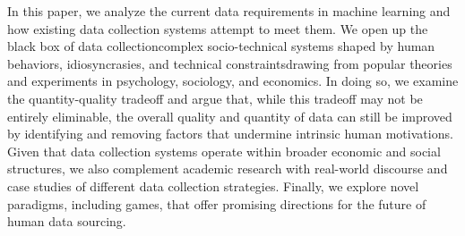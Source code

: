 
In this paper, we analyze the current data requirements in machine learning and how existing data collection systems attempt to meet them. We open up the black box of data collection\textemdash{}complex socio-technical systems shaped by human behaviors, idiosyncrasies, and technical constraints\textemdash{}drawing from popular theories and experiments in psychology, sociology, and economics. In doing so, we examine the quantity-quality tradeoff and argue that, while this tradeoff may not be entirely eliminable, the overall quality and quantity of data can still be improved by identifying and removing factors that undermine intrinsic human motivations. Given that data collection systems operate within broader economic and social structures, we also complement academic research with real-world discourse and case studies of different data collection strategies. Finally, we explore novel paradigms, including games, that offer promising directions for the future of human data sourcing.